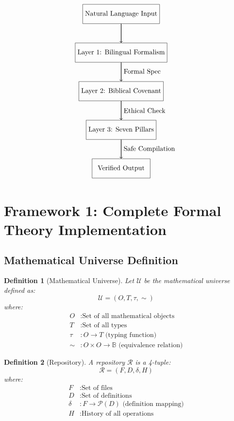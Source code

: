 \documentclass[12pt]{article}
\newtheorem{definition}{Definition}
\begin{document}
\[
\begin{tikzpicture}[node distance=1.5cm]
\node (input) [rectangle, draw, minimum width=3cm, minimum height=1cm] {Natural Language Input};
\node (layer1) [rectangle, draw, minimum width=3cm, minimum height=1cm, below of=input, yshift=-0.5cm] {Layer 1: Bilingual Formalism};
\node (layer2) [rectangle, draw, minimum width=3cm, minimum height=1cm, below of=layer1, yshift=-0.5cm] {Layer 2: Biblical Covenant};
\node (layer3) [rectangle, draw, minimum width=3cm, minimum height=1cm, below of=layer2, yshift=-0.5cm] {Layer 3: Seven Pillars};
\node (output) [rectangle, draw, minimum width=3cm, minimum height=1cm, below of=layer3, yshift=-0.5cm] {Verified Output};

\draw [->, thick] (input) -- (layer1);
\draw [->, thick] (layer1) -- node[right] {Formal Spec} (layer2);
\draw [->, thick] (layer2) -- node[right] {Ethical Check} (layer3);
\draw [->, thick] (layer3) -- node[right] {Safe Compilation} (output);
\end{tikzpicture}
\]

\section{Framework 1: Complete Formal Theory Implementation}

\subsection{Mathematical Universe Definition}

\begin{definition}[Mathematical Universe]
Let $\mathcal{U}$ be the mathematical universe defined as:
\[
\mathcal{U} = (O, T, \tau, \sim)
\]
where:
\begin{align*}
O & : \text{Set of all mathematical objects} \\
T & : \text{Set of all types} \\
\tau & : O \to T \text{ (typing function)} \\
\sim & : O \times O \to \mathbb{B} \text{ (equivalence relation)}
\end{align*}
\end{definition}

\begin{definition}[Repository]
A repository $\mathcal{R}$ is a 4-tuple:
\[
\mathcal{R} = (F, D, \delta, H)
\]
where:
\begin{align*}
F & : \text{Set of files} \\
D & : \text{Set of definitions} \\
\delta & : F \to \mathcal{P}(D) \text{ (definition mapping)} \\
H & : \text{History of all operations}
\end{align*}
\end{definition}
\end{document}
